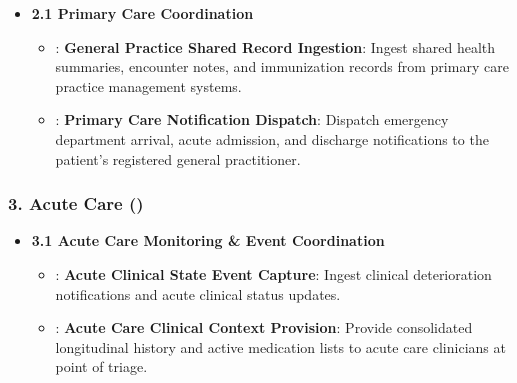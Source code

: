 \begin{itemize}

\item
\textbf{2.1 Primary Care Coordination}


\begin{itemize}

\item
\texttt{}: \textbf{General Practice Shared Record Ingestion}: Ingest shared health summaries, encounter notes, and immunization records from primary care practice management systems.



\item
\texttt{}: \textbf{Primary Care Notification Dispatch}: Dispatch emergency department arrival, acute admission, and discharge notifications to the patient's registered general practitioner.



\end{itemize}


\end{itemize}
\label{rad:enabling:394}
\subsubsection*{3. Acute Care (\texttt{})}
\label{rad:enabling:395}

\begin{itemize}

\item
\textbf{3.1 Acute Care Monitoring \& Event Coordination}


\begin{itemize}

\item
\texttt{}: \textbf{Acute Clinical State Event Capture}: Ingest clinical deterioration notifications and acute clinical status updates.



\item
\texttt{}: \textbf{Acute Care Clinical Context Provision}: Provide consolidated longitudinal history and active medication lists to acute care clinicians at point of triage.



\end{itemize}


\end{itemize}
\label{rad:enabling:399}
